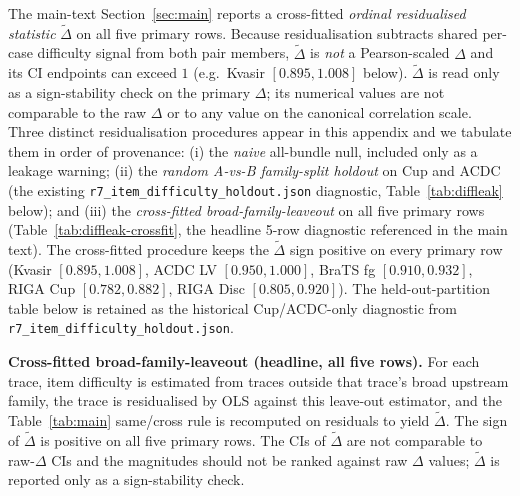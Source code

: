 The main-text Section~\ref{sec:main} reports a cross-fitted \emph{ordinal residualised statistic} $\tilde{\Delta}$ on all five primary rows. Because residualisation subtracts shared per-case difficulty signal from both pair members, $\tilde{\Delta}$ is \emph{not} a Pearson-scaled $\Delta$ and its CI endpoints can exceed $1$ (e.g.\ Kvasir $[0.895, 1.008]$ below). $\tilde{\Delta}$ is read only as a sign-stability check on the primary $\Delta$; its numerical values are not comparable to the raw $\Delta$ or to any value on the canonical correlation scale. Three distinct residualisation procedures appear in this appendix and we tabulate them in order of provenance: (i) the \emph{naive} all-bundle null, included only as a leakage warning; (ii) the \emph{random A-vs-B family-split holdout} on Cup and ACDC (the existing \texttt{r7\_item\_difficulty\_holdout.json} diagnostic, Table~\ref{tab:diffleak} below); and (iii) the \emph{cross-fitted broad-family-leaveout} on all five primary rows (Table~\ref{tab:diffleak-crossfit}, the headline 5-row diagnostic referenced in the main text). The cross-fitted procedure keeps the $\tilde{\Delta}$ sign positive on every primary row (Kvasir $[0.895, 1.008]$, ACDC LV $[0.950, 1.000]$, BraTS fg $[0.910, 0.932]$, RIGA Cup $[0.782, 0.882]$, RIGA Disc $[0.805, 0.920]$). The held-out-partition table below is retained as the historical Cup/ACDC-only diagnostic from \texttt{r7\_item\_difficulty\_holdout.json}.

\textbf{Cross-fitted broad-family-leaveout (headline, all five rows).} For each trace, item difficulty is estimated from traces outside that trace's broad upstream family, the trace is residualised by OLS against this leave-out estimator, and the Table~\ref{tab:main} same/cross rule is recomputed on residuals to yield $\tilde{\Delta}$. The sign of $\tilde{\Delta}$ is positive on all five primary rows. The CIs of $\tilde{\Delta}$ are not comparable to raw-$\Delta$ CIs and the magnitudes should not be ranked against raw $\Delta$ values; $\tilde{\Delta}$ is reported only as a sign-stability check.

